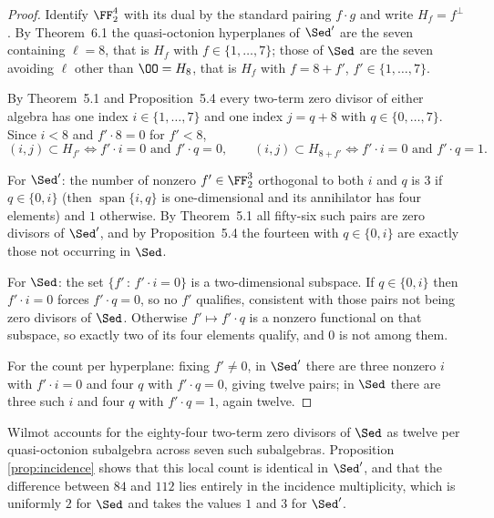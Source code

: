 \begin{proof}
Identify $\FF_2^4$ with its dual by the standard pairing $f\cdot g$ and write
$H_f=f^{\perp}$. By Theorem~6.1 the quasi-octonion hyperplanes of $\Sed'$ are the
seven containing $\ell=8$, that is $H_f$ with $f\in\{1,\dots,7\}$; those of
$\Sed$ are the seven avoiding $\ell$ other than $\OO=H_8$, that is $H_f$ with
$f=8+f'$, $f'\in\{1,\dots,7\}$.

By Theorem~5.1 and Proposition~5.4 every two-term zero divisor of either algebra
has one index $i\in\{1,\dots,7\}$ and one index $j=q+8$ with $q\in\{0,\dots,7\}$.
Since $i<8$ and $f'\cdot 8=0$ for $f'<8$,
\[
  (i,j)\subset H_{f'} \iff f'\cdot i=0 \text{ and } f'\cdot q=0,
  \qquad
  (i,j)\subset H_{8+f'} \iff f'\cdot i=0 \text{ and } f'\cdot q=1 .
\]

For $\Sed'$: the number of nonzero $f'\in\FF_2^3$ orthogonal to both $i$ and $q$
is $3$ if $q\in\{0,i\}$ (then $\operatorname{span}\{i,q\}$ is one-dimensional and
its annihilator has four elements) and $1$ otherwise. By Theorem~5.1 all
fifty-six such pairs are zero divisors of $\Sed'$, and by Proposition~5.4 the
fourteen with $q\in\{0,i\}$ are exactly those not occurring in $\Sed$.

For $\Sed$: the set $\{f'\,:\,f'\cdot i=0\}$ is a two-dimensional subspace. If
$q\in\{0,i\}$ then $f'\cdot i=0$ forces $f'\cdot q=0$, so no $f'$ qualifies,
consistent with those pairs not being zero divisors of $\Sed$. Otherwise
$f'\mapsto f'\cdot q$ is a nonzero functional on that subspace, so exactly two of
its four elements qualify, and $0$ is not among them.

For the count per hyperplane: fixing $f'\neq0$, in $\Sed'$ there are three
nonzero $i$ with $f'\cdot i=0$ and four $q$ with $f'\cdot q=0$, giving twelve
pairs; in $\Sed$ there are three such $i$ and four $q$ with $f'\cdot q=1$, again
twelve.
\end{proof}

\begin{remark}
Wilmot accounts for the eighty-four two-term zero divisors of $\Sed$ as twelve
per quasi-octonion subalgebra across seven such subalgebras. Proposition
\ref{prop:incidence} shows that this local count is identical in $\Sed'$, and
that the difference between $84$ and $112$ lies entirely in the incidence
multiplicity, which is uniformly $2$ for $\Sed$ and takes the values $1$ and $3$
for $\Sed'$.
\end{remark}
